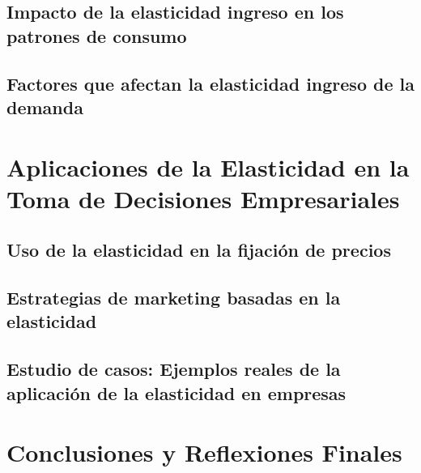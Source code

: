 \documentclass[
  a4paper,
]{article}
\begin{document}
\hypertarget{impacto-de-la-elasticidad-ingreso-en-los-patrones-de-consumo}{%
\subsection{Impacto de la elasticidad ingreso en los patrones de
consumo}\label{impacto-de-la-elasticidad-ingreso-en-los-patrones-de-consumo}}

\hypertarget{factores-que-afectan-la-elasticidad-ingreso-de-la-demanda}{%
\subsection{Factores que afectan la elasticidad ingreso de la
demanda}\label{factores-que-afectan-la-elasticidad-ingreso-de-la-demanda}}

\hypertarget{aplicaciones-de-la-elasticidad-en-la-toma-de-decisiones-empresariales}{%
\section{Aplicaciones de la Elasticidad en la Toma de Decisiones
Empresariales}\label{aplicaciones-de-la-elasticidad-en-la-toma-de-decisiones-empresariales}}

\hypertarget{uso-de-la-elasticidad-en-la-fijaciuxf3n-de-precios}{%
\subsection{Uso de la elasticidad en la fijación de
precios}\label{uso-de-la-elasticidad-en-la-fijaciuxf3n-de-precios}}

\hypertarget{estrategias-de-marketing-basadas-en-la-elasticidad}{%
\subsection{Estrategias de marketing basadas en la
elasticidad}\label{estrategias-de-marketing-basadas-en-la-elasticidad}}

\hypertarget{estudio-de-casos-ejemplos-reales-de-la-aplicaciuxf3n-de-la-elasticidad-en-empresas}{%
\subsection{Estudio de casos: Ejemplos reales de la aplicación de la
elasticidad en
empresas}\label{estudio-de-casos-ejemplos-reales-de-la-aplicaciuxf3n-de-la-elasticidad-en-empresas}}

\hypertarget{conclusiones-y-reflexiones-finales}{%
\section{Conclusiones y Reflexiones
Finales}\label{conclusiones-y-reflexiones-finales}}
\end{document}

